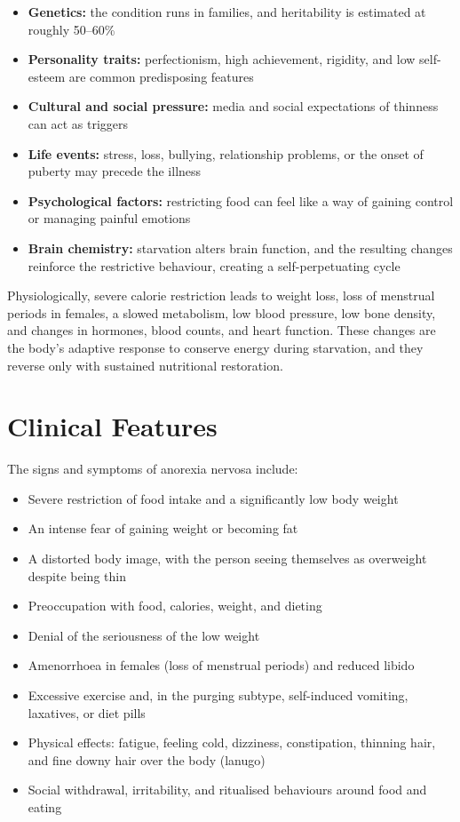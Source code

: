 \begin{itemize}
    \item \textbf{Genetics:} the condition runs in families, and heritability is estimated at roughly 50--60\%
    \item \textbf{Personality traits:} perfectionism, high achievement, rigidity, and low self-esteem are common predisposing features
    \item \textbf{Cultural and social pressure:} media and social expectations of thinness can act as triggers
    \item \textbf{Life events:} stress, loss, bullying, relationship problems, or the onset of puberty may precede the illness
    \item \textbf{Psychological factors:} restricting food can feel like a way of gaining control or managing painful emotions
    \item \textbf{Brain chemistry:} starvation alters brain function, and the resulting changes reinforce the restrictive behaviour, creating a self-perpetuating cycle
\end{itemize}

Physiologically, severe calorie restriction leads to weight loss, loss of menstrual periods in females, a slowed metabolism, low blood pressure, low bone density, and changes in hormones, blood counts, and heart function. These changes are the body's adaptive response to conserve energy during starvation, and they reverse only with sustained nutritional restoration.

\section*{Clinical Features}
The signs and symptoms of anorexia nervosa include:

\begin{itemize}
    \item Severe restriction of food intake and a significantly low body weight
    \item An intense fear of gaining weight or becoming fat
    \item A distorted body image, with the person seeing themselves as overweight despite being thin
    \item Preoccupation with food, calories, weight, and dieting
    \item Denial of the seriousness of the low weight
    \item Amenorrhoea in females (loss of menstrual periods) and reduced libido
    \item Excessive exercise and, in the purging subtype, self-induced vomiting, laxatives, or diet pills
    \item Physical effects: fatigue, feeling cold, dizziness, constipation, thinning hair, and fine downy hair over the body (lanugo)
    \item Social withdrawal, irritability, and ritualised behaviours around food and eating
\end{itemize}

